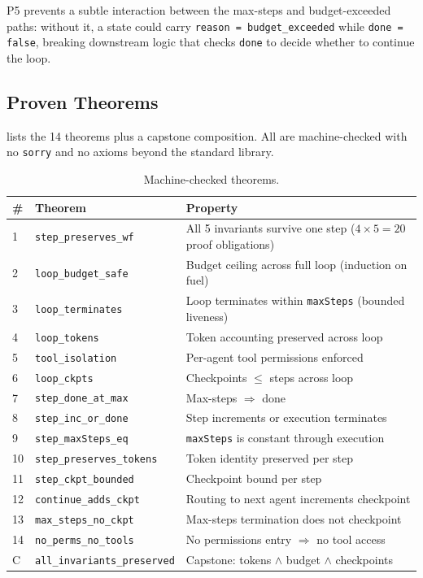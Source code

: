 \documentclass[11pt,a4paper]{article}
\begin{document}
P5 prevents a subtle interaction between the max-steps and
budget-exceeded paths: without it, a state could carry
\texttt{reason = budget\_exceeded} while \texttt{done = false},
breaking downstream logic that checks \texttt{done} to decide
whether to continue the loop.

\subsection{Proven Theorems}

 lists the 14 theorems plus a capstone
composition. All are machine-checked with no \texttt{sorry} and no
axioms beyond the standard library.

\begin{table}[htbp]
\centering
\caption{Machine-checked theorems.}
\label{tab:theorems}
\small
\begin{tabular}{@{}llp{6cm}@{}}
\toprule
\textbf{\#} & \textbf{Theorem} & \textbf{Property} \\
\midrule
1 & \texttt{step\_preserves\_wf} & All 5 invariants survive one step ($4 \times 5 = 20$ proof obligations) \\
2 & \texttt{loop\_budget\_safe} & Budget ceiling across full loop (induction on fuel) \\
3 & \texttt{loop\_terminates} & Loop terminates within \texttt{maxSteps} (bounded liveness) \\
4 & \texttt{loop\_tokens} & Token accounting preserved across loop \\
5 & \texttt{tool\_isolation} & Per-agent tool permissions enforced \\
6 & \texttt{loop\_ckpts} & Checkpoints $\leq$ steps across loop \\
\midrule
7 & \texttt{step\_done\_at\_max} & Max-steps $\Rightarrow$ done \\
8 & \texttt{step\_inc\_or\_done} & Step increments or execution terminates \\
9 & \texttt{step\_maxSteps\_eq} & \texttt{maxSteps} is constant through execution \\
10 & \texttt{step\_preserves\_tokens} & Token identity preserved per step \\
11 & \texttt{step\_ckpt\_bounded} & Checkpoint bound per step \\
12 & \texttt{continue\_adds\_ckpt} & Routing to next agent increments checkpoint \\
13 & \texttt{max\_steps\_no\_ckpt} & Max-steps termination does not checkpoint \\
14 & \texttt{no\_perms\_no\_tools} & No permissions entry $\Rightarrow$ no tool access \\
\midrule
C & \texttt{all\_invariants\_preserved} & Capstone: tokens $\wedge$ budget $\wedge$ checkpoints \\
\bottomrule
\end{tabular}
\end{table}
\end{document}
